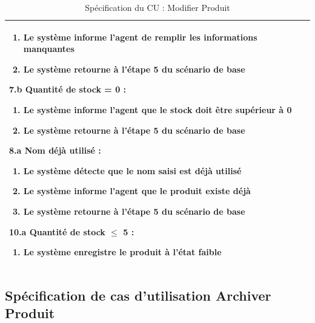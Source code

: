 \begin{table}[H]
\begin{tabularx}{\textwidth}{|p{3.4cm}|X|}
\begin{enumerate}[leftmargin=1.5em, topsep=1pt, itemsep=0pt]
  \item Le système informe l’agent de remplir les informations manquantes
  \item Le système retourne à l’étape 5 du scénario de base
\end{enumerate}
\textbf{7.b Quantité de stock = 0 :}
\begin{enumerate}[leftmargin=1.5em, topsep=1pt, itemsep=0pt]
  \item Le système informe l’agent que le stock doit être supérieur à 0
  \item Le système retourne à l’étape 5 du scénario de base
\end{enumerate}
\textbf{8.a Nom déjà utilisé :}
\begin{enumerate}[leftmargin=1.5em, topsep=1pt, itemsep=0pt]
  \item Le système détecte que le nom saisi est déjà utilisé
  \item Le système informe l’agent que le produit existe déjà
  \item Le système retourne à l’étape 5 du scénario de base
\end{enumerate}
\textbf{10.a Quantité de stock $\leq$ 5 :}
\begin{enumerate}[leftmargin=1.5em, topsep=1pt, itemsep=0pt]
  \item Le système enregistre le produit à l’état faible
\end{enumerate} \\
\hline
\end{tabularx}
\caption{Spécification du CU : Modifier Produit}
\label{tab:cu-modifier-produit}
\end{table}

\newpage
\subsection{Spécification de cas d'utilisation Archiver Produit}

